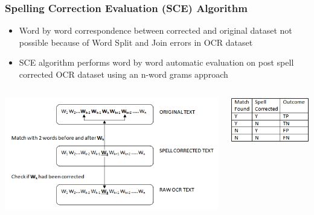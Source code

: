 \documentclass{beamer}
\begin{document}
\begin{frame}
\frametitle{Spelling Correction Evaluation (SCE) Algorithm}
\begin{itemize}
 \justifying

\item Word by word correspondence between corrected and original dataset not possible because of Word Split and Join errors in OCR dataset
\item SCE algorithm performs word by word automatic evaluation on post spell corrected OCR dataset using an n-word grams approach
\end{itemize}

\begin{columns}
\centering
\includegraphics[scale=0.5]{images/ngram}

\centering
\includegraphics[scale=0.5]{images/ngram2}


\end{columns}
\end{frame}
\end{document}

